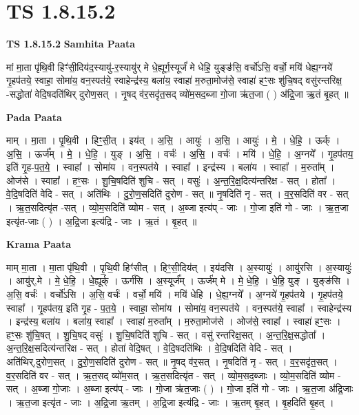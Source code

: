\documentclass[17pt]{extarticle}
\begin{document}
\section{ TS 1.8.15.2 }

\textbf{TS 1.8.15.2 } \newline
\textbf{Samhita Paata} \newline

मां मा॒ता पृ॑थि॒वी हिꣳ॑सी॒दिय॑द॒स्यायु॑-र॒स्यायु॑र् मे धे॒ह्यूर्ग॒स्यूर्जं॑ मे धेहि॒ युङ्ङ॑सि॒ वर्चो॑ऽसि॒ वर्चो॒ मयि॑ धेह्य॒ग्नये॑ गृ॒हप॑तये॒ स्वाहा॒ सोमा॑य॒ वन॒स्पत॑ये॒ स्वाहेन्द्र॑स्य॒ बला॑य॒ स्वाहा॑ म॒रुता॒मोज॑से॒ स्वाहा॑ हꣳ॒॒सः शु॑चि॒षद् वसु॑रन्तरिक्ष॒ -सद्धोता॑ वेदि॒षदति॑थिर् दुरोण॒सत् । नृ॒षद् व॑र॒सदृ॑त॒सद् व्यो॑म॒सद॒ब्जा गो॒जा ऋ॑त॒जा ( ) अ॑द्रि॒जा ऋ॒तं बृ॒हत् ॥ \newline

\textbf{Pada Paata} \newline

माम् । मा॒ता । पृ॒थि॒वी । हिꣳ॒॒सी॒त् । इय॑त् । अ॒सि॒ । आयुः॑ । अ॒सि॒ । आयुः॑ । मे॒ । धे॒हि॒ । ऊर्क् । अ॒सि॒ । ऊर्ज᳚म् । मे॒ । धे॒हि॒ । युङ् । अ॒सि॒ । वर्चः॑ । अ॒सि॒ । वर्चः॑ । मयि॑ । धे॒हि॒ । अ॒ग्नये᳚ । गृ॒हप॑तय॒ इति॑ गृ॒ह-प॒त॒ये॒ । स्वाहा᳚ । सोमा॑य । वन॒स्पत॑ये । स्वाहा᳚ । इन्द्र॑स्य । बला॑य । स्वाहा᳚ । म॒रुता᳚म् । ओज॑से । स्वाहा᳚ । हꣳ॒॒सः । शु॒चि॒षदिति॑ शुचि - सत् । वसुः॑ । अ॒न्त॒रि॒क्ष॒दित्य॑न्तरिक्ष - सत् । होता᳚ । वे॒दि॒षदिति॑ वेदि - सत् । अति॑थिः । दु॒रो॒ण॒सदिति॑ दुरोण - सत् ॥ नृ॒षदिति॑ नृ - सत् । व॒र॒सदिति॑ वर - सत् । ऋ॒त॒सदित्यृ॑त -सत् । व्यो॒म॒सदिति॑ व्योम - सत् । अ॒ब्जा इत्य॑प् - जाः । गो॒जा इति॑ गो - जाः । ऋ॒त॒जा इत्यृ॑त-जाः ( ) । अ॒द्रि॒जा इत्य॑द्रि - जाः । ऋ॒तं । बृ॒हत् ॥  \newline


\textbf{Krama Paata} \newline

माम् मा॒ता । मा॒ता पृ॑थि॒वी । पृ॒थि॒वी हिꣳ॑सीत् । हिꣳ॒॒सी॒दिय॑त् । इय॑दसि । अ॒स्यायुः॑ । आयु॑रसि । अ॒स्यायुः॑ । आयु॑र्,मे । मे॒ धे॒हि॒ । धे॒ह्यूर्क् । ऊर्ग॑सि । अ॒स्यूर्ज᳚म् । ऊर्ज॑म् मे । मे॒ धे॒हि॒ । धे॒हि॒ युङ् । युङ्ङ॑सि । अ॒सि॒ वर्चः॑ । वर्चो॑ऽसि । अ॒सि॒ वर्चः॑ । वर्चो॒ मयि॑ । मयि॑ धेहि । धे॒ह्य॒ग्नये᳚ । अ॒ग्नये॑ गृ॒हप॑तये । गृ॒हप॑तये॒ स्वाहा᳚ । गृ॒हप॑तय॒ इति॑ गृ॒ह - प॒त॒ये॒ । स्वाहा॒ सोमा॑य । सोमा॑य॒ वन॒स्पत॑ये । वन॒स्पत॑ये॒ स्वाहा᳚ । स्वाहेन्द्र॑स्य । इन्द्र॑स्य॒ बला॑य । बला॑य॒ स्वाहा᳚ । स्वाहा॑ म॒रुता᳚म् । म॒रुता॒मोज॑से । ओज॑से॒ स्वाहा᳚ । स्वाहा॑ हꣳ॒॒सः । हꣳ॒॒सः शु॑चि॒षत् । शु॒चि॒षद् वसुः॑ । शु॒चि॒षदिति॑ शुचि - सत् । वसु॑ रन्तरिक्ष॒सत् । अ॒न्त॒रि॒क्ष॒सद्धोता᳚ । अ॒न्त॒रि॒क्ष॒सदित्य॑न्तरिक्ष - सत् । होता॑ वेदि॒षत् । वे॒दि॒षदति॑थिः । वे॒दि॒षदिति॑ वेदि - सत् । अति॑थिर्,दुरोण॒सत् । दु॒रो॒ण॒सदिति॑ दुरोण - सत् ॥ नृ॒षद् व॑र॒सत् । नृ॒षदिति॑ नृ - सत् । व॒र॒सदृ॑त॒सत् । व॒र॒सदिति॑ वर - सत् । ऋ॒त॒सद् व्यो॑म॒सत् । ऋ॒त॒सदित्यृ॑त - सत् । व्यो॒म॒सद॒ब्जाः । व्यो॒म॒सदिति॑ व्योम - सत् । अ॒ब्जा गो॒जाः । अ॒ब्जा इत्य॑प् - जाः । गो॒जा ऋ॑त॒जाः ( ) । गो॒जा इति॑ गो - जाः । ऋ॒त॒जा अ॑द्रि॒जाः । ऋ॒त॒जा इत्यृ॑त - जाः । अ॒द्रि॒जा ऋ॒तम् । अ॒द्रि॒जा इत्य॑द्रि - जाः । ऋ॒तम् बृ॒हत् । बृ॒हदिति॑ बृ॒हत् । \newline
\end{document}
